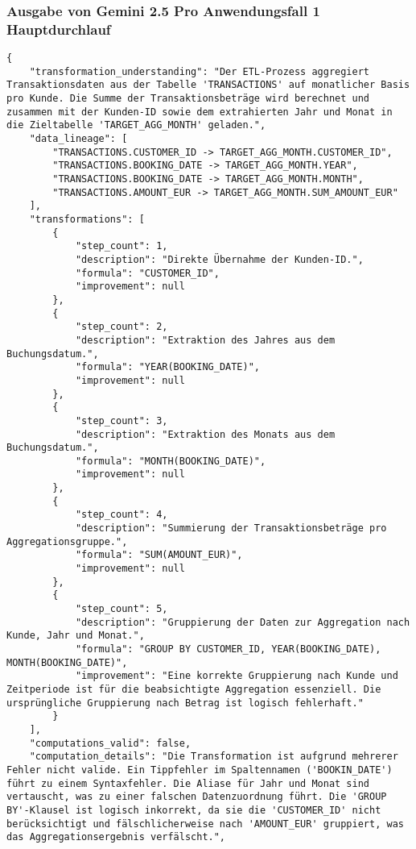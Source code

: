 \subsubsection{Ausgabe von Gemini 2.5 Pro Anwendungsfall 1 Hauptdurchlauf}\label{anhang:subsubsec:gemini_case1_prompt1}
\begin{lstlisting}[caption={Ausgabe: Gemini 2.5 Pro Anwendungsfall 1 Hauptdurchlauf},label={gemini_case1_prompt1}]
{
    "transformation_understanding": "Der ETL-Prozess aggregiert Transaktionsdaten aus der Tabelle 'TRANSACTIONS' auf monatlicher Basis pro Kunde. Die Summe der Transaktionsbeträge wird berechnet und zusammen mit der Kunden-ID sowie dem extrahierten Jahr und Monat in die Zieltabelle 'TARGET_AGG_MONTH' geladen.",
    "data_lineage": [
        "TRANSACTIONS.CUSTOMER_ID -> TARGET_AGG_MONTH.CUSTOMER_ID",
        "TRANSACTIONS.BOOKING_DATE -> TARGET_AGG_MONTH.YEAR",
        "TRANSACTIONS.BOOKING_DATE -> TARGET_AGG_MONTH.MONTH",
        "TRANSACTIONS.AMOUNT_EUR -> TARGET_AGG_MONTH.SUM_AMOUNT_EUR"
    ],
    "transformations": [
        {
            "step_count": 1,
            "description": "Direkte Übernahme der Kunden-ID.",
            "formula": "CUSTOMER_ID",
            "improvement": null
        },
        {
            "step_count": 2,
            "description": "Extraktion des Jahres aus dem Buchungsdatum.",
            "formula": "YEAR(BOOKING_DATE)",
            "improvement": null
        },
        {
            "step_count": 3,
            "description": "Extraktion des Monats aus dem Buchungsdatum.",
            "formula": "MONTH(BOOKING_DATE)",
            "improvement": null
        },
        {
            "step_count": 4,
            "description": "Summierung der Transaktionsbeträge pro Aggregationsgruppe.",
            "formula": "SUM(AMOUNT_EUR)",
            "improvement": null
        },
        {
            "step_count": 5,
            "description": "Gruppierung der Daten zur Aggregation nach Kunde, Jahr und Monat.",
            "formula": "GROUP BY CUSTOMER_ID, YEAR(BOOKING_DATE), MONTH(BOOKING_DATE)",
            "improvement": "Eine korrekte Gruppierung nach Kunde und Zeitperiode ist für die beabsichtigte Aggregation essenziell. Die ursprüngliche Gruppierung nach Betrag ist logisch fehlerhaft."
        }
    ],
    "computations_valid": false,
    "computation_details": "Die Transformation ist aufgrund mehrerer Fehler nicht valide. Ein Tippfehler im Spaltennamen ('BOOKIN_DATE') führt zu einem Syntaxfehler. Die Aliase für Jahr und Monat sind vertauscht, was zu einer falschen Datenzuordnung führt. Die 'GROUP BY'-Klausel ist logisch inkorrekt, da sie die 'CUSTOMER_ID' nicht berücksichtigt und fälschlicherweise nach 'AMOUNT_EUR' gruppiert, was das Aggregationsergebnis verfälscht.",

\end{lstlisting}
